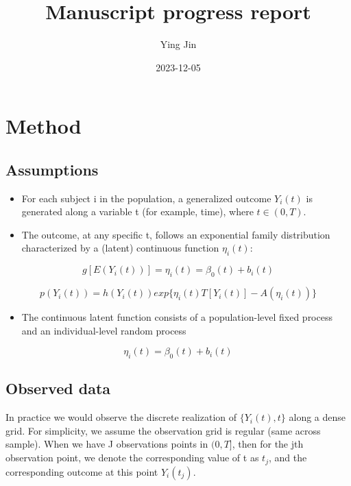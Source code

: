 \documentclass[
]{article}
\title{Manuscript progress report}
\author{Ying Jin}
\date{2023-12-05}
\providecommand{\tightlist}{%
  \setlength{\itemsep}{0pt}\setlength{\parskip}{0pt}}
\begin{document}
\maketitle

{
\setcounter{tocdepth}{3}
\tableofcontents
}
\hypertarget{method}{%
\section{Method}\label{method}}

\hypertarget{assumptions}{%
\subsection{Assumptions}\label{assumptions}}

\begin{itemize}
\tightlist
\item
  For each subject i in the population, a generalized outcome \(Y_i(t)\)
  is generated along a variable t (for example, time), where
  \(t \in (0, T)\).
\item
  The outcome, at any specific t, follows an exponential family
  distribution characterized by a (latent) continuous function
  \(\eta_i(t)\):
\end{itemize}

\[g[E(Y_i(t))] = \eta_i(t) = \beta_0(t)+b_i(t)\]

\[p(Y_i(t)) = h(Y_i(t))exp\{\eta_i(t)T[Y_i(t)]-A(\eta_i(t))\}\]

\begin{itemize}
\tightlist
\item
  The continuous latent function consists of a population-level fixed
  process and an individual-level random process
\end{itemize}

\[\eta_i(t) = \beta_0(t)+b_i(t)\]

\hypertarget{observed-data}{%
\subsection{Observed data}\label{observed-data}}

In practice we would observe the discrete realization of
\(\{Y_i(t), t\}\) along a dense grid. For simplicity, we assume the
observation grid is regular (same across sample). When we have J
observations points in \((0, T]\), then for the jth observation point,
we denote the corresponding value of t as \(t_j\), and the corresponding
outcome at this point \(Y_i(t_j)\).
\end{document}
